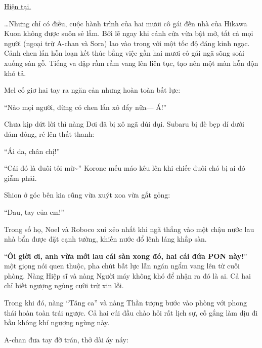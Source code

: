\documentclass[../main.tex]{subfiles}
\begin{document}
\begin{center}
    \uline{Hiện tại.}
\end{center}

\dots Nhưng chỉ có điều, cuộc hành trình của hai mươi cô gái đến nhà của Hikawa Kuon không được suôn sẻ lắm. Bởi lẽ ngay khi cánh cửa vừa bật mở, tất cả mọi người (ngoại trừ A-chan và Sora) lao vào trong với một tốc độ đáng kinh ngạc. Cảnh chen lấn hỗn loạn kết thúc bằng việc gần hai mươi cô gái ngã sõng soài xuống sàn gỗ. Tiếng va đập rầm rầm vang lên liên tục, tạo nên một màn hỗn độn khó tả.

Mel cố giơ hai tay ra ngăn cản nhưng hoàn toàn bất lực:

``Nào mọi người, đừng có chen lấn xô đẩy nữa--- Á!''

Chưa kịp dứt lời thì nàng Dơi đã bị xô ngã dúi dụi. Subaru bị đè bẹp dí dưới đám đông, ré lên thất thanh:

``Ái da, chân chị!''

``Cái đó là đuôi tôi mừ\~{}'' Korone mếu máo kêu lên khi chiếc đuôi chó bị ai đó giẫm phải.

Shion ở góc bên kia cũng vừa xuýt xoa vừa gắt gỏng:

``Đau, tay của em!''

Trong số họ, Noel và Roboco xui xẻo nhất khi ngã thẳng vào một chậu nước lau nhà bẩn được đặt cạnh tường, khiến nước đổ lênh láng khắp sàn.

``\textbf{Ôi giời ơi, anh vừa mới lau cái sàn xong đó, hai cái đứa PON này!}'' một giọng nói quen thuộc, pha chút bất lực lẫn ngán ngẩm vang lên từ cuối phòng. Nàng Hiệp sĩ và nàng Người máy không khó để nhận ra đó là ai. Cả hai chỉ biết ngượng ngùng cười trừ xin lỗi.

Trong khi đó, nàng ``Tăng ca'' và nàng Thần tượng bước vào phòng với phong thái hoàn toàn trái ngược. Cả hai cúi đầu chào hỏi rất lịch sự, cố gắng làm dịu đi bầu không khí ngượng ngùng này.

A-chan đưa tay đỡ trán, thở dài áy náy:
\end{document}
